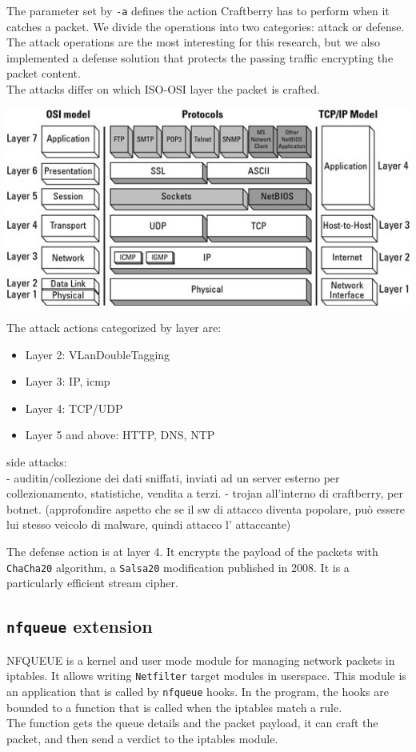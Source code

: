 \documentclass[12pt]{article}
\begin{document}
	The parameter set by \lstinline{-a} defines the action Craftberry has to perform when it catches a packet. We divide the operations into two categories: attack or defense. The attack operations are the most interesting for this research, but we also implemented a defense solution that protects the passing traffic encrypting the packet content.\\
	The attacks differ on which ISO-OSI layer the packet is crafted.\\
	
	\bigbreak

	\begin{center}
		\includegraphics[width=0.7\linewidth]{images/iso_osi_layers.jpg}
	\end{center}

	\bigbreak
	
	The attack actions categorized by layer are:
	\begin{itemize}
		\item Layer 2: VLanDoubleTagging
		\item Layer 3: IP, icmp
		\item Layer 4: TCP/UDP
		\item Layer 5 and above: HTTP, DNS, NTP
	\end{itemize}

	\bigbreak
	
	side attacks:\\
	- auditin/collezione dei dati sniffati, inviati ad un server esterno per collezionamento, statistiche, vendita a terzi.
	- trojan all'interno di craftberry, per botnet. (approfondire aspetto che se il sw di attacco diventa popolare, può essere lui stesso veicolo di malware, quindi attacco l' attaccante)

	The defense action is at layer 4. It encrypts the payload of the packets with \lstinline{ChaCha20} algorithm, a \lstinline{Salsa20} modification published in 2008. It is a particularly efficient stream cipher.\\

	\subsection{\lstinline{nfqueue} extension}
	NFQUEUE is a kernel and user mode module for managing network packets in iptables. It allows writing \lstinline{Netfilter} target modules in userspace. This module is an application that is called by \lstinline{nfqueue} hooks. In the program, the hooks are bounded to a function that is called when the iptables match a rule.\\
	The function gets the queue details and the packet payload, it can craft the packet, and then send a verdict to the iptables module. 
	\bigbreak
\end{document}
